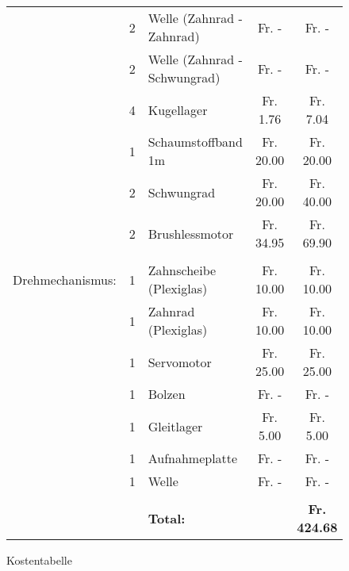 \begin{figure}[h!]
\begin{tabular}{rclcc}
               & 2     & Welle (Zahnrad - Zahnrad) &  Fr. -    &  Fr. -    \\
               & 2     & Welle (Zahnrad - Schwungrad) &  Fr. -    &  Fr. -    \\
          & 4     & Kugellager &  Fr. 1.76  &  Fr. 7.04  \\
          & 1     & Schaumstoffband 1m &  Fr. 20.00  &  Fr. 20.00  \\
          & 2     & Schwungrad &  Fr. 20.00  &  Fr. 40.00  \\
          & 2     & Brushlessmotor &  Fr. 34.95  &  Fr.  69.90  \\
          &       &       &       &  \\
    Drehmechanismus: & 1     & Zahnscheibe (Plexiglas) &  Fr. 10.00  &  Fr. 10.00  \\
          & 1     & Zahnrad (Plexiglas) &  Fr. 10.00  &  Fr. 10.00  \\
          & 1     & Servomotor &  Fr. 25.00  &  Fr. 25.00  \\
          & 1     & Bolzen &  Fr. -    &  Fr. -    \\
          & 1     & Gleitlager &  Fr. 5.00  &  Fr. 5.00  \\
          & 1     & Aufnahmeplatte &  Fr.              -    &  Fr. -    \\
          & 1     & Welle &  Fr. -    &  Fr. -    \\
          &       &       &       &  \\
          &       & \textbf{Total:} & \textbf{} & \textbf{ Fr. 424.68 } \\

    \end{tabular}
    
    
     \caption{Kostentabelle}

\end{figure}